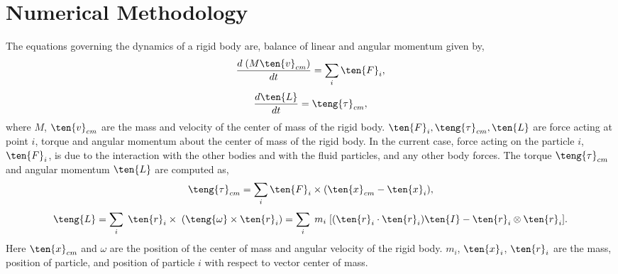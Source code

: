 \section{Numerical Methodology}
\label{sec:rfc:rbd}
The equations governing the dynamics of a rigid body are, balance of linear and
angular momentum given by,
\begin{equation}
  \label{eq:rfc:balance_linear_mom}
  \frac{d \; (M \ten{v}_{cm})}{d t} = \sum_i \ten{F}_i,
\end{equation}
\begin{equation}
  \label{eq:rfc:balance_angular_mom}
  \frac{d \ten{L}}{d t} = \teng{\tau}_{cm},
\end{equation}
where $M$, $\ten{v}_{cm}$ are the mass and velocity of the center of mass of the rigid body.
$\ten{F}_i, \teng{\tau}_{cm}, \ten{L} $ are force acting at point $i$, torque and
angular momentum about the center of mass of the rigid body. In the current
case, force acting on the particle $i$, $\ten{F}_i$, is due to the interaction
with the other bodies and with the fluid particles, and any other body forces.
The torque $\teng{\tau}_{cm}$ and angular momentum $\ten{L}$ are computed as,
\begin{equation}
  \label{eq:rfc:torque}
 \teng{\tau}_{cm} = \sum_i \ten{F}_i \times (\ten{x}_{cm} - \ten{x}_{i}),
\end{equation}
\begin{equation}
  \label{eq:rfc:moi}
  \teng{L} =
  \sum_i \; \ten{r}_i \times \; (\teng{\omega} \times \ten{r}_i)
  = \sum_i \; m_i \; [(\ten{r}_i \cdot \ten{r}_i) \ten{I} - \ten{r}_i \otimes \ten{r}_i].
\end{equation}
Here $\ten{x}_{cm}$ and $\omega$ are the position of the center of mass and
angular velocity of the rigid body. $m_i$, $\ten{x}_{i}$, $\ten{r}_i$ are the
mass, position of particle, and position of particle $i$ with respect to vector
center of mass.

